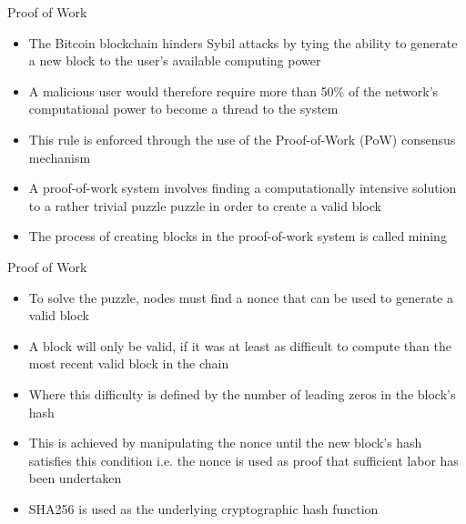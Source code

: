 \documentclass[10pt]{beamer}
\begin{document}

\begin{frame}{Proof of Work}
	\begin{itemize}
		\item The Bitcoin blockchain hinders Sybil attacks by tying the ability to generate a new block to the user's available computing power
		\item A malicious user would therefore require more than 50\% of the network's computational power to become a thread to the system
		\item This rule is enforced through the use of the Proof-of-Work (PoW) consensus mechanism
		\item A proof-of-work system involves finding a computationally intensive solution to a rather trivial puzzle puzzle in order to create a valid block
		\item The process of creating blocks in the proof-of-work system is called mining
	\end{itemize}
\end{frame}

\begin{frame}{Proof of Work}
	\begin{itemize}
		\item To solve the puzzle, nodes must find a nonce that can be used to generate a valid block
		\item A block will only be valid, if it was at least as difficult to compute than the most recent valid block in the chain
		\item Where this difficulty is defined by the number of leading zeros in the block's hash
		\item This is achieved by manipulating the nonce until the new block's hash satisfies this condition i.e. the nonce is used as proof that sufficient labor has been undertaken
		\item SHA256 is used as the underlying cryptographic hash function
		\end{itemize}
\end{frame}

\end{document}
